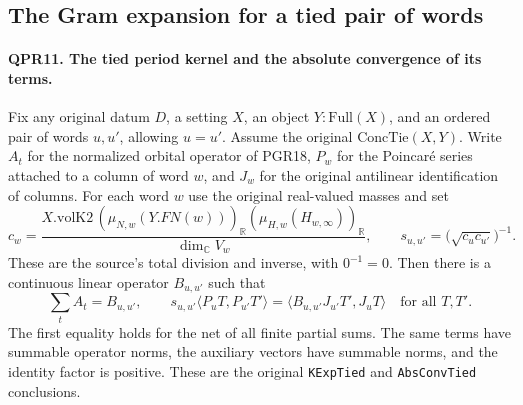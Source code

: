 

\subsection{The Gram expansion for a tied pair of words}
\paragraph{QPR11. The tied period kernel and the absolute convergence of its terms.}
Fix any original datum $D$, a setting $X$, an object $Y:\mathrm{Full}(X)$,
and an ordered pair of words $u,u'$, allowing $u=u'$. Assume the
original $\mathrm{ConcTie}(X,Y)$. Write $A_t$ for the normalized
orbital operator of PGR18, $P_w$ for the Poincar\'e series attached
to a column of word $w$, and $J_w$ for the original antilinear
identification of columns. For each word $w$ use the original real-valued masses and set
\[
 c_w=\frac{X.\mathrm{volK2}\,(\mu_{N,w}(Y.FN(w)))_{\mathbb R}
                         (\mu_{H,w}(H_{w,\infty}))_{\mathbb R}}
                 {\dim_{\mathbb C}V_w},\qquad
 s_{u,u'}=\bigl(\sqrt{c_uc_{u'}}\bigr)^{-1}.
\]
These are the source's total division and inverse, with $0^{-1}=0$. Then there is
a continuous linear operator $B_{u,u'}$ such that
\[
  \sum_t A_t = B_{u,u'},\qquad
  s_{u,u'}\langle P_uT,P_{u'}T'\rangle
       =\langle B_{u,u'}J_{u'}T',J_uT\rangle
       \quad\text{for all }T,T'.
\]
The first equality holds for the net of all finite partial sums.
The same terms have summable operator norms, the auxiliary vectors
have summable norms, and the identity factor is positive. These
are the original \texttt{KExpTied} and \texttt{AbsConvTied} conclusions.

